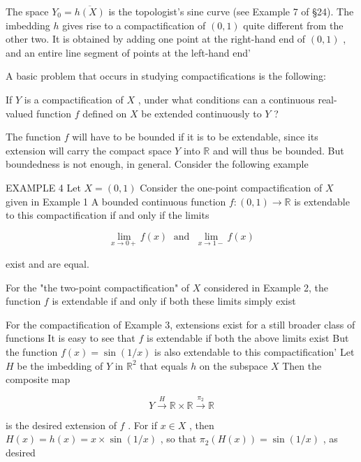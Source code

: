 \documentclass[10pt]{article}
\begin{document}
The space \({Y}_{0} = \overline{h\left( X\right) }\) is the topologist’s sine curve (see Example 7 of §24). The imbedding \(h\) gives rise to a compactification of \(\left( {0,1}\right)\) quite different from the other two. It is obtained by adding one point at the right-hand end of \(\left( {0,1}\right)\) , and an entire line segment of points at the left-hand end'

A basic problem that occurs in studying compactifications is the following:

If \(Y\) is a compactification of \(X\) , under what conditions can a continuous real-valued function \(f\) defined on \(X\) be extended continuously to \(Y\) ?

The function \(f\) will have to be bounded if it is to be extendable, since its extension will carry the compact space \(Y\) into \(\mathbb{R}\) and will thus be bounded. But boundedness is not enough, in general. Consider the following example

EXAMPLE 4 Let \(X = \left( {0,1}\right)\) Consider the one-point compactification of \(X\) given in Example 1 A bounded continuous function \(f : \left( {0,1}\right)  \rightarrow  \mathbb{R}\) is extendable to this compactification if and only if the limits

\[
\mathop{\lim }\limits_{{x \rightarrow  0 + }}f\left( x\right) \;\text{ and }\;\mathop{\lim }\limits_{{x \rightarrow  1 - }}f\left( x\right)
\]

exist and are equal.

For the "the two-point compactification" of \(X\) considered in Example 2, the function \(f\) is extendable if and only if both these limits simply exist

For the compactification of Example 3, extensions exist for a still broader class of functions It is easy to see that \(f\) is extendable if both the above limits exist But the function \(f\left( x\right)  = \sin \left( {1/x}\right)\) is also extendable to this compactification’ Let \(H\) be the imbedding of \(Y\) in \({\mathbb{R}}^{2}\) that equals \(h\) on the subspace \(X\) Then the composite map

\[
Y\overset{H}{ \rightarrow  }\mathbb{R} \times  \mathbb{R}\overset{{\pi }_{2}}{ \rightarrow  }\mathbb{R}
\]

is the desired extension of \(f\) . For if \(x \in  X\) , then \(H\left( x\right)  = h\left( x\right)  = x \times  \sin \left( {1/x}\right)\) , so that \({\pi }_{2}\left( {H\left( x\right) }\right)  = \sin \left( {1/x}\right)\) , as desired
\end{document}

